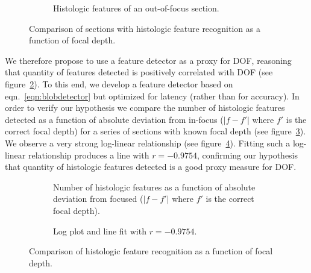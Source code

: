 \documentclass[sigconf,nonacm]{acmart}
\begin{document}
\begin{figure}
\begin{subfigure}[b]{0.5\textwidth}
        \caption{Histologic features of an out-of-focus section.}
        \label{subfig:outoffocus}
    \end{subfigure}
    \caption{Comparison of sections with histologic feature recognition as a function of focal depth.}
    \label{fig:histfeatsimages}
\end{figure}

We therefore propose to use a feature detector as a proxy for DOF, reasoning that quantity of features detected is positively correlated with DOF (see figure~\ref{fig:histfeatsimages}).
To this end, we develop a feature detector based on eqn.~\ref{eqn:blobdetector} but optimized for latency (rather than for accuracy).
In order to verify our hypothesis we compare the number of histologic features detected as a function of absolute deviation from in-focus ($\lvert f - f' \rvert$ where $f'$ is the correct focal depth) for a series of sections with known focal depth (see figure~\ref{subfig:degreeoofcurve}).
We observe a very strong log-linear relationship (see figure~\ref{subfig:degreeooffit}).
Fitting such a log-linear relationship produces a line with $r=-0.9754$, confirming our hypothesis that quantity of histologic features detected is a good proxy measure for DOF.

\begin{figure}
    \centering
    \begin{subfigure}[b]{0.5\textwidth}
        \centering
        
        \caption{Number of histologic features as a function of absolute deviation from focused ($\lvert f - f' \rvert$ where $f'$ is the correct focal depth).}
        \label{subfig:degreeoofcurve}
    \end{subfigure}
    \par\medskip
    \begin{subfigure}[b]{0.5\textwidth}
        \centering
        
        \caption{Log plot and line fit with $r = -0.9754$.}
        \label{subfig:degreeooffit}
    \end{subfigure}
    \caption{Comparison of histologic feature recognition as a function of focal depth.}
    \label{fig:histfeats}
\end{figure}
\end{document}
